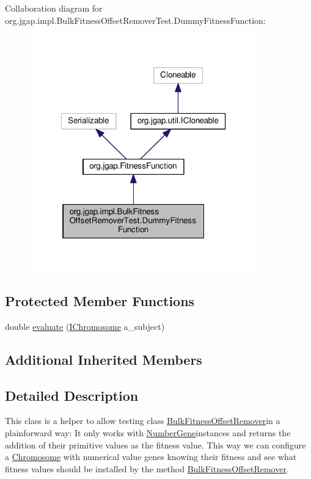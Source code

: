 Collaboration diagram for org.\-jgap.\-impl.\-Bulk\-Fitness\-Offset\-Remover\-Test.\-Dummy\-Fitness\-Function\-:
\nopagebreak
\begin{figure}[H]
\begin{center}
\leavevmode
\includegraphics[width=280pt]{classorg_1_1jgap_1_1impl_1_1_bulk_fitness_offset_remover_test_1_1_dummy_fitness_function__coll__graph}
\end{center}
\end{figure}
\subsection*{Protected Member Functions}
\begin{DoxyCompactItemize}
\item 
double \hyperlink{classorg_1_1jgap_1_1impl_1_1_bulk_fitness_offset_remover_test_1_1_dummy_fitness_function_a2747fc89c0b198c7ed5123d9f7257163}{evaluate} (\hyperlink{interfaceorg_1_1jgap_1_1_i_chromosome}{I\-Chromosome} a\-\_\-subject)
\end{DoxyCompactItemize}
\subsection*{Additional Inherited Members}


\subsection{Detailed Description}
This class is a helper to allow testing class \hyperlink{classorg_1_1jgap_1_1impl_1_1_bulk_fitness_offset_remover}{Bulk\-Fitness\-Offset\-Remover}in a plainforward way\-: It only works with \hyperlink{classorg_1_1jgap_1_1impl_1_1_number_gene}{Number\-Gene}instances and returns the addition of their primitive values as the fitness value. This way we can configure a \hyperlink{classorg_1_1jgap_1_1_chromosome}{Chromosome} with numerical value genes knowing their fitness and see what fitness values should be installed by the method \hyperlink{classorg_1_1jgap_1_1impl_1_1_bulk_fitness_offset_remover}{Bulk\-Fitness\-Offset\-Remover}. 


